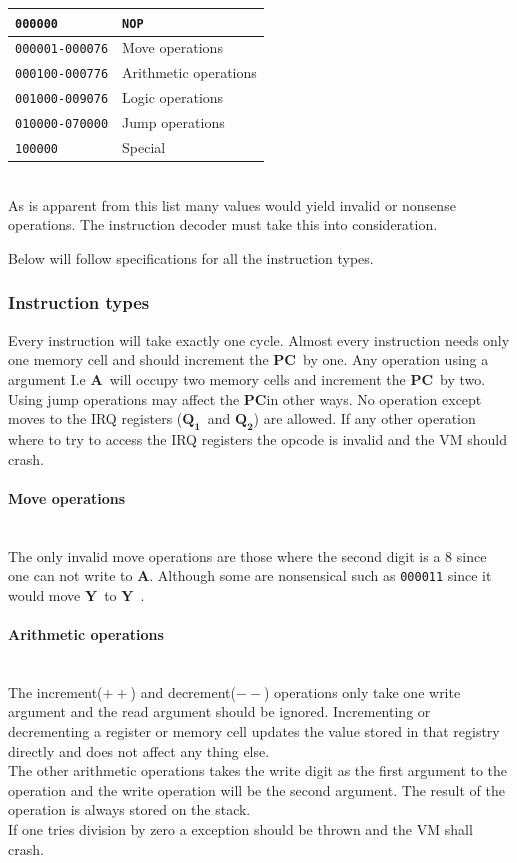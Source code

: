 \documentclass{article}
\newcommand{\V}{\verb}
\newcommand{\y}{$\textbf{Y}$}
\newcommand{\A}{$\textbf{A}$}
\newcommand{\q}{$\textbf{Q}_{\textbf{1}}$}
\newcommand{\qq}{$\textbf{Q}_{\textbf{2}}$}
\newcommand{\pc}{$\textbf{PC}$}
\begin{document}
\begin{tabular}{l l}
  \V+000000+ & \V+NOP+ \\
  \hline
  \V+000001-000076+ & Move operations \\
  \hline
  \V+000100-000776+ & Arithmetic operations \\
  \hline
  \V+001000-009076+ & Logic operations \\
  \hline
  \V+010000-070000+ & Jump operations \\
  \hline
  \V+100000+ & Special \\
\end{tabular} \\
As is apparent from this list many values would yield invalid or
nonsense operations.
The instruction decoder must take this into consideration.

Below will follow specifications for all the instruction types.

\subsubsection{Instruction types}
Every instruction will take exactly one cycle. Almost every instruction needs
only one memory cell and should increment the \pc \  by one.
Any operation using  a argument I.e \A \ will occupy two memory cells and
increment the \pc \ by two.\\
Using jump operations may affect the \pc in other ways.
No operation except moves to the IRQ registers (\q \ and \qq ) are allowed.
If any other operation where to try to access the IRQ registers the opcode is
invalid and the VM should crash.

\paragraph{Move operations}\
\\
The only invalid move operations are those where the second digit is a 8 since
one can not write to \A.
Although some are nonsensical such as \V+000011+ since it would move \y \ to \y \ .

\paragraph{Arithmetic operations} \
\\
The increment($++$) and decrement($--$) operations only take one write argument
and the read argument should be ignored. Incrementing or decrementing a register
or memory cell updates the value stored in that registry directly and does not
affect any thing else.\\
The other arithmetic operations takes the write digit as the first argument to
the operation and the write operation will be the second argument.
The result of the operation is always stored on the stack.\\
If one tries division by zero a exception should be thrown and the VM shall
crash.
\end{document}
